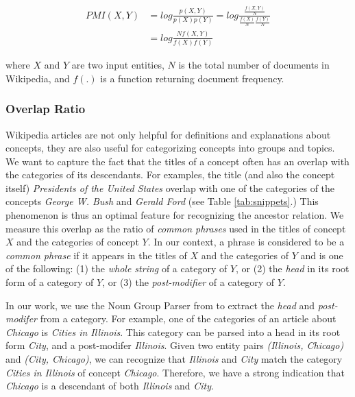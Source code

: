 \begin{align}
\label{eq:2}
  PMI(X, Y) & = log \frac{p(X, Y)}{p(X)p(Y)} = log \frac{\frac{f(X,Y)}{N}}{\frac{f(X)}{N} \frac{f(Y)}{N}} \nonumber \\ 
            & = log\frac{N f(X,Y)}{f(X)f(Y)}
\end{align}


where $X$ and $Y$ are two input entities, $N$ is the total number of
documents in Wikipedia, and $f(.)$ is a function returning document
frequency.

\subsubsection{Overlap Ratio}
Wikipedia articles are not only helpful for definitions and
explanations about concepts, they are also useful for categorizing
concepts into groups and topics. We want to capture the fact that the
titles of a concept often has an overlap with the categories of its
descendants. For examples, the title (and also the concept itself)
{\em Presidents of the United States} overlap with one of the
categories of the concepts {\em George W. Bush} and {\em Gerald Ford}
(see Table \ref{tab:snippets}.) This phenomenon is thus an optimal
feature for recognizing the ancestor relation. We measure this overlap
as the ratio of {\em common phrases} used in the titles of concept $X$
and the categories of concept $Y$. In our context, a phrase is
considered to be a {\em common phrase} if it appears in the titles of
$X$ and the categories of $Y$ and is one of the following: (1) the
{\em whole string} of a category of $Y$, or (2) the {\em head} in its
root form of a category of $Y$, or (3) the {\em post-modifier} of a
category of $Y$.


In our work, we use the Noun Group Parser from \cite{suchanek2007WWW}
to extract the {\em head} and {\em post-modifer} from a category. For
example, one of the categories of an article about \emph{Chicago} is
\emph{Cities in Illinois}. This category can be parsed into a head in
its root form \emph{City}, and a post-modifer \emph{Illinois}. Given
two entity pairs \emph{(Illinois, Chicago)} and \emph{(City,
  Chicago)}, we can recognize that \emph{Illinois} and \emph{City}
match the category {\em Cities in Illinois} of concept {\em
  Chicago}. Therefore, we have a strong indication that {\em Chicago}
is a descendant of both {\em Illinois} and {\em City}.

